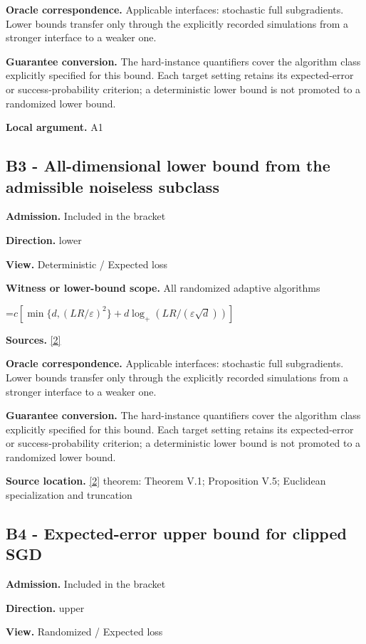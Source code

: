 \documentclass[10pt,a4paper]{article}
\newcommand{\AtlasMath}[1]{\par\begingroup\centering\setbox0=\hbox{$\displaystyle #1$}\ifdim\wd0>1.4\linewidth\typeout{ATLAS WIDE FORMULA: \the\wd0}\fi\ifdim\wd0>\linewidth\resizebox{\linewidth}{!}{\box0}\else\box0\fi\par\endgroup}
\begin{document}
\textbf{Oracle correspondence.} Applicable interfaces: stochastic full subgradients. Lower bounds transfer only through the explicitly recorded simulations from a stronger interface to a weaker one.

\textbf{Guarantee conversion.} The hard-instance quantifiers cover the algorithm class explicitly specified for this bound. Each target setting retains its expected-error or success-probability criterion; a deterministic lower bound is not promoted to a randomized lower bound.

\textbf{Local argument.} A1

\subsection{B3 - All-dimensional lower bound from the admissible noiseless subclass}
\textbf{Admission.} Included in the bracket

\textbf{Direction.} lower

\textbf{View.} Deterministic / Expected loss

\textbf{Witness or lower-bound scope.} All randomized adaptive algorithms

\AtlasMath{c[\min\{d,(LR/\varepsilon)^2\}+d\log_+(LR/(\varepsilon\sqrt d))]}
\textbf{Sources.} \href{https://arxiv.org/pdf/1407.5144}{[2]}

\textbf{Oracle correspondence.} Applicable interfaces: stochastic full subgradients. Lower bounds transfer only through the explicitly recorded simulations from a stronger interface to a weaker one.

\textbf{Guarantee conversion.} The hard-instance quantifiers cover the algorithm class explicitly specified for this bound. Each target setting retains its expected-error or success-probability criterion; a deterministic lower bound is not promoted to a randomized lower bound.

\textbf{Source location.} \href{https://arxiv.org/pdf/1407.5144}{[2]} theorem: Theorem V.1; Proposition V.5; Euclidean specialization and truncation

\subsection{B4 - Expected-error upper bound for clipped SGD}
\textbf{Admission.} Included in the bracket

\textbf{Direction.} upper

\textbf{View.} Randomized / Expected loss
\end{document}
